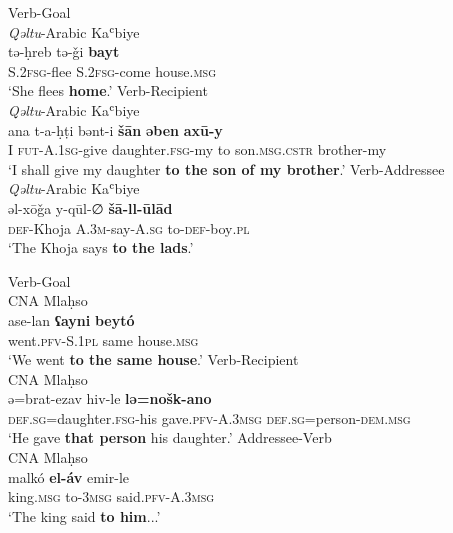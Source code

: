 \documentclass[output=paper,colorlinks,citecolor=brown,draftmode]{langscibook}
\begin{document}
\ea\label{Arabic:ex:17}
\ea\label{Arabic:ex:17a}
Verb-Goal\\
\textit{Qəltu}-Arabic Kaʿbiye \citep[XIV:§4]{Jastrow2022CADiyarbakir} \\
\gll tə-ḥreb tə-ǧi \textbf{bayt} \\
     \textsc{S.2fsg}-flee \textsc{S.2fsg}-come house\textsc{.msg} \\
\glt `She flees \textbf{home}.'
\ex\label{Arabic:ex:17b}
Verb-Recipient\\
\textit{Qəltu}-Arabic Kaʿbiye \citep[XIII:§1]{Jastrow2022CADiyarbakir} \\
\gll ana t-a-ḥṭi bənt-i \textbf{šān} \textbf{əben} \textbf{axū-y} \\
     I \textsc{fut-A.1sg-}give daughter\textsc{.fsg-}my to son.\textsc{msg.cstr} brother-my  \\
\glt `I shall give my daughter \textbf{to the son of my brother}.' 
\newpage
\ex\label{Arabic:ex:17c}
Verb-Addressee\\
\textit{Qəltu}-Arabic Kaʿbiye \citep[XIV:§24]{Jastrow2022CADiyarbakir} \\
\gll əl-xōǧa y-qūl-∅ \textbf{šā-ll-ūlād} \\
     \textsc{def-}Khoja \textsc{A.3m-}say-\textsc{A.sg} to\textsc{-def-}boy\textsc{.pl}  \\
\glt `The Khoja says \textbf{to the lads}.'
\z
\z

\ea\label{Arabic:ex:18}
\ea\label{Arabic:ex:18a}
Verb-Goal\\
CNA Mlaḥso \citep[108.§25]{Jastrow1994Mlahso} \\
\gll ase-lan \textbf{ʕayni} \textbf{beytó} \\
     went\textsc{.pfv-S.1pl} same house\textsc{.msg} \\
\glt `We went \textbf{to the same house}.'
\ex\label{Arabic:ex:18b}
Verb-Recipient\\
CNA Mlaḥso \citep[163.§117]{Jastrow1994Mlahso} \\
\gll ə=brat-ezav hiv-le \textbf{lə=nošk-ano} \\
     \textsc{def.sg=}daughter\textsc{.fsg-}his gave\textsc{.pfv-A.3msg} \textsc{def.sg=}person\textsc{-dem.msg} \\
\glt `He gave \textbf{that person} his daughter.'
\ex\label{Arabic:ex:18c}
Addressee-Verb\\
CNA Mlaḥso \citep[90.§115]{Jastrow1994Mlahso} \\
\gll malkó \textbf{el-áv} emir-le \\
     king\textsc{.msg} to\textsc{-3msg} said\textsc{.pfv-A.3msg} \\
\glt `The king said \textbf{to him}...'
\z
\z
\end{document}
